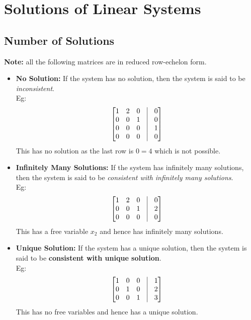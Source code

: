 \documentclass{article}
\begin{document}
\section{Solutions of Linear Systems}
\subsection{Number of Solutions}
\textbf{Note:} all the following matrices are in reduced row-echelon form.
\begin{itemize}
    \item \textbf{No Solution:} If the system has no solution, then the system is said to be \emph{inconsistent}.\\
    Eg: $$\begin{bmatrix}
        1 & 2 & 0 & \vline & 0 \\
        0 & 0 & 1 & \vline & 0 \\
        0 & 0 & 0 & \vline & 1 \\
        0 & 0 & 0 & \vline & 0 
        \end{bmatrix}$$
        This has no solution as the last row is $0 = 4$ which is not possible.
    \item \textbf{Infinitely Many Solutions:} If the system has infinitely many solutions, then the system is said to be \emph{consistent with infinitely many solutions}.\\
    Eg: $$\begin{bmatrix}
        1 & 2 & 0 & \vline & 0 \\
        0 & 0 & 1 & \vline & 2 \\
        0 & 0 & 0 & \vline & 0 
        \end{bmatrix}$$
        This has a free variable $x_2$ and hence has infinitely many solutions.

        \item \textbf{Unique Solution:} If the system has a unique solution, then the system is said to be \textbf{consistent with unique solution}.\\
    Eg: $$\begin{bmatrix}
        1 & 0 & 0 & \vline & 1 \\
        0 & 1 & 0 & \vline & 2 \\
        0 & 0 & 1 & \vline & 3 
        \end{bmatrix}$$
        This has no free variables and hence has a unique solution.
\end{itemize}
\end{document}
